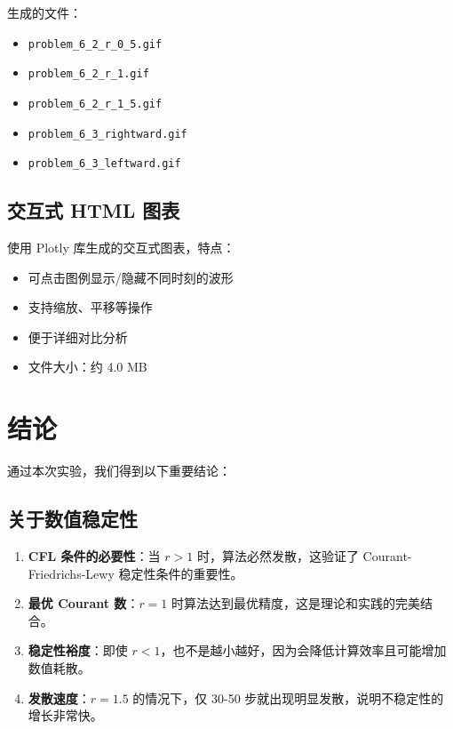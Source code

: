 \documentclass[12pt,a4paper]{article}
\begin{document}
生成的文件：
\begin{itemize}
    \item \texttt{problem\_6\_2\_r\_0\_5.gif}
    \item \texttt{problem\_6\_2\_r\_1.gif}
    \item \texttt{problem\_6\_2\_r\_1\_5.gif}
    \item \texttt{problem\_6\_3\_rightward.gif}
    \item \texttt{problem\_6\_3\_leftward.gif}
\end{itemize}

\subsection{交互式 HTML 图表}

使用 Plotly 库生成的交互式图表，特点：
\begin{itemize}
    \item 可点击图例显示/隐藏不同时刻的波形
    \item 支持缩放、平移等操作
    \item 便于详细对比分析
    \item 文件大小：约 4.0 MB
\end{itemize}

\section{结论}

通过本次实验，我们得到以下重要结论：

\subsection{关于数值稳定性}

\begin{enumerate}
    \item \textbf{CFL 条件的必要性}：当 $r > 1$ 时，算法必然发散，这验证了 Courant-Friedrichs-Lewy 稳定性条件的重要性。
    
    \item \textbf{最优 Courant 数}：$r = 1$ 时算法达到最优精度，这是理论和实践的完美结合。
    
    \item \textbf{稳定性裕度}：即使 $r < 1$，也不是越小越好，因为会降低计算效率且可能增加数值耗散。
    
    \item \textbf{发散速度}：$r = 1.5$ 的情况下，仅 30-50 步就出现明显发散，说明不稳定性的增长非常快。
\end{enumerate}
\end{document}
